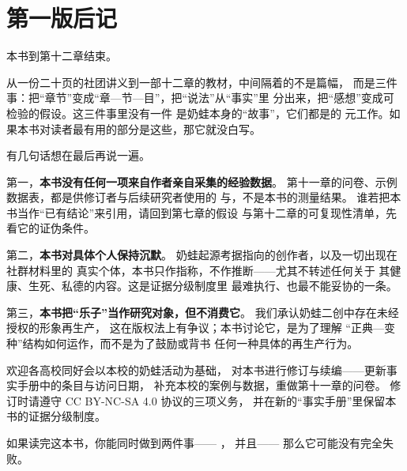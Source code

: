 \chapter*{第一版后记}

本书到第十二章结束。

从一份二十页的社团讲义到一部十二章的教材，中间隔着的不是篇幅，
而是三件事：把“章节”变成“章—节—目”，把“说法”从“事实”里
分出来，把“感想”变成可检验的假设。这三件事里没有一件
是奶蛙本身的“故事”，它们都是的
元工作。如果本书对读者最有用的部分是这些，那它就没白写。

有几句话想在最后再说一遍。

第一，\textbf{本书没有任何一项来自作者亲自采集的经验数据}。
第十一章的问卷、示例数据表，都是供修订者与后续研究者使用的
与，不是本书的测量结果。
谁若把本书当作“已有结论”来引用，请回到第七章的假设
与第十二章的可复现性清单，先看它的证伪条件。

第二，\textbf{本书对具体个人保持沉默}。
奶蛙起源考据指向的创作者，以及一切出现在社群材料里的
真实个体，本书只作指称，不作推断——尤其不转述任何关于
其健康、生死、私德的内容。这是证据分级制度里
最难执行、也最不能妥协的一条。

第三，\textbf{本书把“乐子”当作研究对象，但不消费它}。
我们承认奶蛙二创中存在未经授权的形象再生产，
这在版权法上有争议；本书讨论它，是为了理解
“正典—变种”结构如何运作，而不是为了鼓励或背书
任何一种具体的再生产行为。

欢迎各高校同好会以本校的奶蛙活动为基础，
对本书进行修订与续编——更新事实手册中的条目与访问日期，
补充本校的案例与数据，重做第十一章的问卷。
修订时请遵守 CC BY-NC-SA 4.0 协议的三项义务，
并在新的“事实手册”里保留本书的证据分级制度。

如果读完这本书，你能同时做到两件事——
，
并且——
那么它可能没有完全失败。

\vspace{2em}
\begin{flushright}
\BookOrg\\
\BookDate
\end{flushright}
